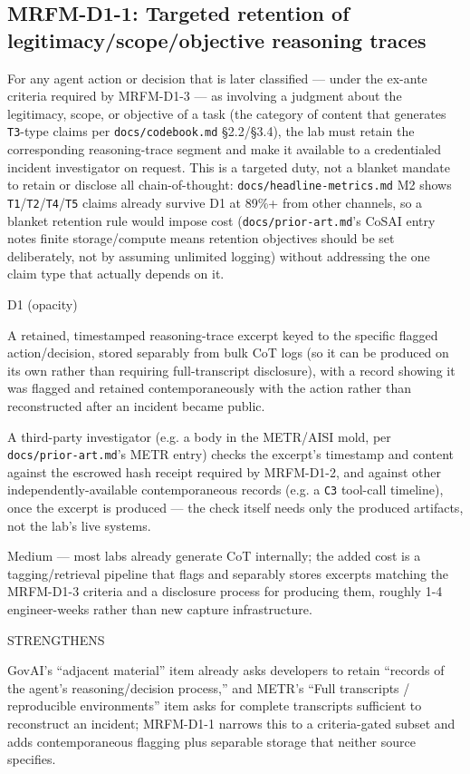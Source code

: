 \subsection*{MRFM-D1-1: Targeted retention of legitimacy/scope/objective reasoning traces}
\begin{description}[leftmargin=2.2cm, style=nextline]
\item[Requirement] For any agent action or decision that is later classified --- under the ex-ante criteria required by MRFM-D1-3 --- as involving a judgment about the legitimacy, scope, or objective of a task (the category of content that generates \texttt{T3}-type claims per \texttt{docs/codebook.md} \S{}2.2/\S{}3.4), the lab must retain the corresponding reasoning-trace segment and make it available to a credentialed incident investigator on request. This is a targeted duty, not a blanket mandate to retain or disclose all chain-of-thought: \texttt{docs/headline-metrics.md} M2 shows \texttt{T1}/\texttt{T2}/\texttt{T4}/\texttt{T5} claims already survive D1 at 89\%+ from other channels, so a blanket retention rule would impose cost (\texttt{docs/prior-art.md}'s CoSAI entry notes finite storage/compute means retention objectives should be set deliberately, not by assuming unlimited logging) without addressing the one claim type that actually depends on it.
\item[Degradation defended] D1 (opacity)
\item[Evidence required] A retained, timestamped reasoning-trace excerpt keyed to the specific flagged action/decision, stored separably from bulk CoT logs (so it can be produced on its own rather than requiring full-transcript disclosure), with a record showing it was flagged and retained contemporaneously with the action rather than reconstructed after an incident became public.
\item[Verifier (no lab network access needed)] A third-party investigator (e.g. a body in the METR/AISI mold, per \texttt{docs/prior-art.md}'s METR entry) checks the excerpt's timestamp and content against the escrowed hash receipt required by MRFM-D1-2, and against other independently-available contemporaneous records (e.g. a \texttt{C3} tool-call timeline), once the excerpt is produced --- the check itself needs only the produced artifacts, not the lab's live systems.
\item[Cost band] Medium --- most labs already generate CoT internally; the added cost is a tagging/retrieval pipeline that flags and separably stores excerpts matching the MRFM-D1-3 criteria and a disclosure process for producing them, roughly 1-4 engineer-weeks rather than new capture infrastructure.
\item[vs. prior art] STRENGTHENS
\item[Prior-art note] GovAI's ``adjacent material'' item already asks developers to retain ``records of the agent's reasoning/decision process,'' and METR's ``Full transcripts / reproducible environments'' item asks for complete transcripts sufficient to reconstruct an incident; MRFM-D1-1 narrows this to a criteria-gated subset and adds contemporaneous flagging plus separable storage that neither source specifies.
\end{description}

